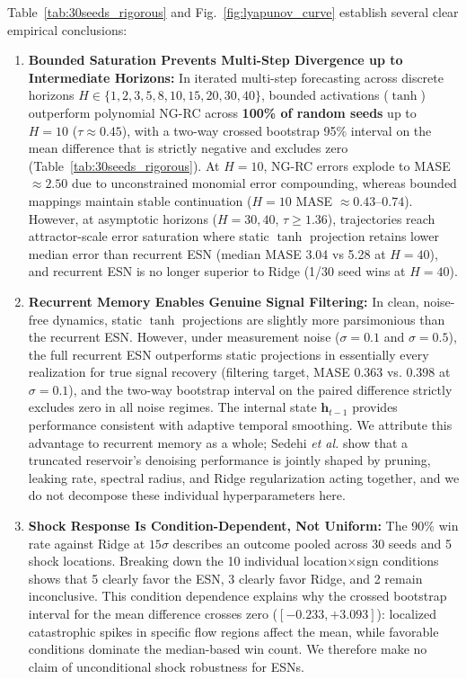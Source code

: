 \documentclass[aip,cha,reprint,amsmath,amssymb]{revtex4-2}
\begin{document}
Table~\ref{tab:30seeds_rigorous} and Fig.~\ref{fig:lyapunov_curve} establish several clear empirical conclusions:
\begin{enumerate}
    \item \textbf{Bounded Saturation Prevents Multi-Step Divergence up to Intermediate Horizons:} In iterated multi-step forecasting across discrete horizons $H \in \{1, 2, 3, 5, 8, 10, 15, 20, 30, 40\}$, bounded activations ($\tanh$) outperform polynomial NG-RC across \textbf{100\% of random seeds} up to $H=10$ ($\tau \approx 0.45$), with a two-way crossed bootstrap 95\% interval on the mean difference that is strictly negative and excludes zero (Table~\ref{tab:30seeds_rigorous}). At $H=10$, NG-RC errors explode to MASE $\approx 2.50$ due to unconstrained monomial error compounding, whereas bounded mappings maintain stable continuation ($H=10$ MASE $\approx 0.43$--$0.74$). However, at asymptotic horizons ($H=30, 40$, $\tau \ge 1.36$), trajectories reach attractor-scale error saturation where static $\tanh$ projection retains lower median error than recurrent ESN (median MASE 3.04 vs 5.28 at $H=40$), and recurrent ESN is no longer superior to Ridge (1/30 seed wins at $H=40$).
    \item \textbf{Recurrent Memory Enables Genuine Signal Filtering:} In clean, noise-free dynamics, static $\tanh$ projections are slightly more parsimonious than the recurrent ESN. However, under measurement noise ($\sigma=0.1$ and $\sigma=0.5$), the full recurrent ESN outperforms static projections in essentially every realization for true signal recovery (filtering target, MASE 0.363 vs. 0.398 at $\sigma=0.1$), and the two-way bootstrap interval on the paired difference strictly excludes zero in all noise regimes. The internal state $\mathbf{h}_{t-1}$ provides performance consistent with adaptive temporal smoothing. We attribute this advantage to recurrent memory as a whole; Sedehi \emph{et al.} \cite{sedehi2025denoising} show that a truncated reservoir's denoising performance is jointly shaped by pruning, leaking rate, spectral radius, and Ridge regularization acting together, and we do not decompose these individual hyperparameters here.
    \item \textbf{Shock Response Is Condition-Dependent, Not Uniform:} The 90\% win rate against Ridge at $15\sigma$ describes an outcome pooled across 30 seeds and 5 shock locations. Breaking down the 10 individual location$\times$sign conditions shows that 5 clearly favor the ESN, 3 clearly favor Ridge, and 2 remain inconclusive. This condition dependence explains why the crossed bootstrap interval for the mean difference crosses zero ($[-0.233, +3.093]$): localized catastrophic spikes in specific flow regions affect the mean, while favorable conditions dominate the median-based win count. We therefore make no claim of unconditional shock robustness for ESNs.
\end{enumerate}
\end{document}
